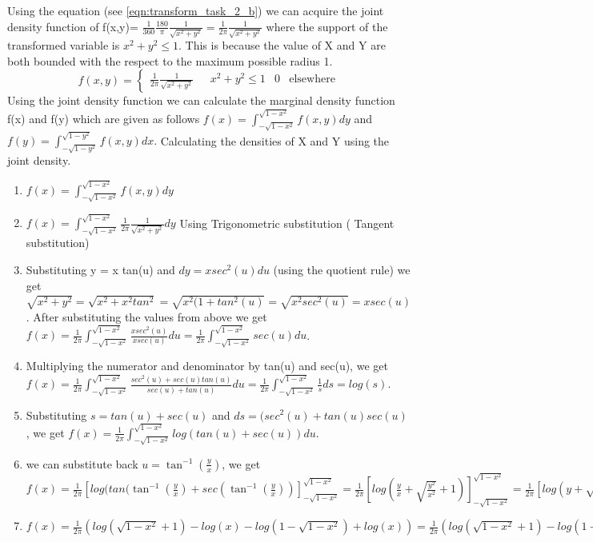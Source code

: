 Using the equation (see \ref{eqn:transform_task_2_b}) we can acquire the joint density function of f(x,y)= $\frac{1}{360}\frac{180}{\pi}\frac{1}{\sqrt{x^2+y^2}} = \frac{1}{2\pi}\frac{1}{\sqrt{x^2+y^2}}$ where the support of the transformed variable is $x^2+y^2 \leq 1$. This is because the value of X and Y are both bounded with the respect to the maximum possible radius 1.
\begin{equation}\label{eqn:density_task_2_b}
   f(x,y) =  \begin{cases*}
   \frac{1}{2\pi}\frac{1}{\sqrt{x^2+y^2}} &\text{ $x^2+y^2 \leq 1$}
    &0&\text{elsewhere}
\end{cases*}
\end{equation}
Using the joint density function we can calculate the marginal density function f(x) and f(y) which are given as follows $f(x) = \int_{-\sqrt{1-x^2}}^{\sqrt{1-x^2}} f(x,y) dy $ and $f(y) = \int_{-\sqrt{1-y^2}}^{\sqrt{1-y^2}} f(x,y) dx .$
Calculating the densities of X and Y using the joint density.
\begin{enumerate}\label{eqn:density_x_task_2_b_sol}
    \item $f(x) = \int_{-\sqrt{1-x^2}}^{\sqrt{1-x^2}} f(x,y) dy $
    \item $f(x) = \int_{-\sqrt{1-x^2}}^{\sqrt{1-x^2}}  \frac{1}{2\pi}\frac{1}{\sqrt{x^2+y^2}} dy$ Using Trigonometric substitution (\cite{wiki:trig} Tangent substitution)
    \item Substituting y = x tan(u) and $dy = x sec^2(u)du$ (using the quotient rule) we get $\sqrt{x^2+y^2}= \sqrt{x^2+x^2tan^2}= \sqrt{x^2(1+tan^2(u)} = \sqrt{x^2sec^2(u)} = x sec(u)$. \newline After substituting the values from above we get  $f(x) = \frac{1}{2\pi}\int_{-\sqrt{1-x^2}}^{\sqrt{1-x^2}} \frac{xsec^2(u)}{x sec(u)} du = \frac{1}{2\pi}\int_{-\sqrt{1-x^2}}^{\sqrt{1-x^2}} sec(u) du$.
    \item Multiplying the numerator and denominator by tan(u) and sec(u), we get $f(x) = \frac{1}{2\pi}\int_{-\sqrt{1-x^2}}^{\sqrt{1-x^2}} \frac{sec^2(u) + sec(u)tan(u)}{sec(u)+tan(u)}du = \frac{1}{2\pi}\int_{-\sqrt{1-x^2}}^{\sqrt{1-x^2}}\frac{1}{s} ds = log(s).$
    \item Substituting $s = tan(u) + sec(u)$ and $ds = (sec^2(u) +tan(u)sec(u)$, we get $f(x) = \frac{1}{2\pi}\int_{-\sqrt{1-x^2}}^{\sqrt{1-x^2}} log(tan(u) + sec(u)) du .$
    \item we can substitute back $u = \tan^{-1}(\frac{y}{x})$, we get $f(x) = \frac{1}{2\pi}[log(tan(\tan^{-1}(\frac{y}{x}) + sec(\tan^{-1}(\frac{y}{x}))]_{-\sqrt{1-x^2}}^{\sqrt{1-x^2}} = \frac{1}{2\pi}[log(\frac{y}{x} + \sqrt{\frac{y^2}{x^2}}+1)]_{-\sqrt{1-x^2}}^{\sqrt{1-x^2}} = \frac{1}{2\pi}[log(y + \sqrt{y^2+x^2}) -log(x))]_{-\sqrt{1-x^2}}^{\sqrt{1-x^2}}$
    \item $f(x) = \frac{1}{2\pi} (log(\sqrt{1-x^2}+1) - log(x) - log(1-\sqrt{1-x^2})+ log(x))= \frac{1}{2\pi} (log(\sqrt{1-x^2}+1)- log(1-\sqrt{1-x^2})) $
\end{enumerate} 
